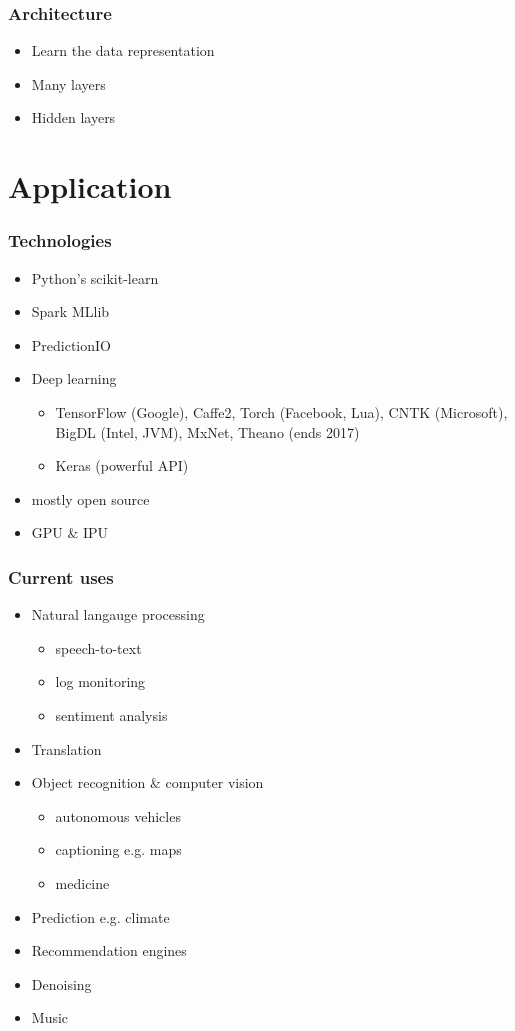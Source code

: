 \documentclass[xcolor={dvipsnames}]{beamer}
\begin{document}
\begin{frame}
  \frametitle{Architecture}
  \begin{itemize}
    \item<+-> Learn the data representation
    \item<+-> Many layers
    \item<+-> Hidden layers
  \end{itemize}
\end{frame}

\section{Application}

\begin{frame}
  \frametitle{Technologies}
  \begin{itemize}
    \item<+-> Python's scikit-learn
    \item<+-> Spark MLlib
    \item<+-> PredictionIO
    \item<+-> Deep learning
      \begin{itemize}
        \item TensorFlow (Google), Caffe2, Torch (Facebook, Lua), CNTK (Microsoft), BigDL (Intel, JVM), MxNet, Theano (ends 2017)
        \item Keras (powerful API)
      \end{itemize}
    \item<+-> mostly open source
    \item<+-> GPU \& IPU
  \end{itemize}
\end{frame}

\begin{frame}
  \frametitle{Current uses}
  \begin{itemize}
    \item<+-> Natural langauge processing
      \begin{itemize}
        \item speech-to-text
        \item log monitoring
        \item sentiment analysis
      \end{itemize}
    \item<+-> Translation
    \item<+-> Object recognition \& computer vision
      \begin{itemize}
        \item autonomous vehicles
        \item captioning e.g. maps
        \item medicine
      \end{itemize}
    \item<+-> Prediction e.g. climate
    \item<+-> Recommendation engines
    \item<+-> Denoising
    \item<+-> Music
  \end{itemize}
\end{frame}
\end{document}
